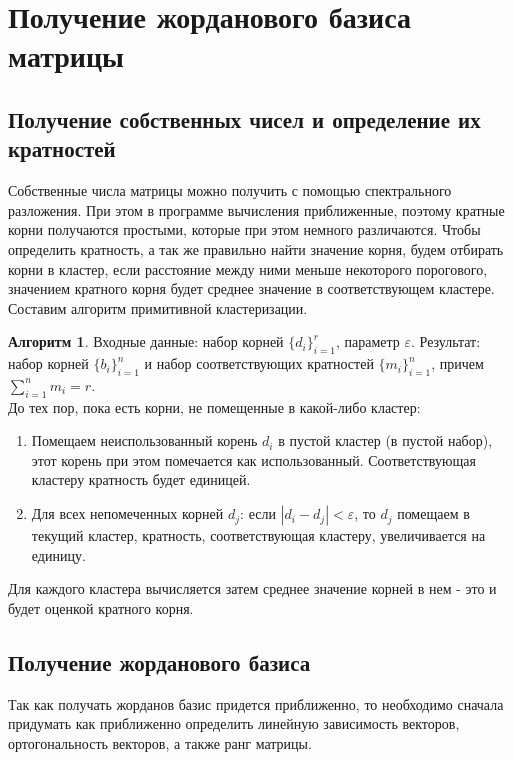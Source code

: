 \documentclass[specialist, substylefile = spbureport.rtx, subf,href,colorlinks=true, 12pt]{disser}
\theoremstyle{definition}
\newtheorem{algorithm}{Алгоритм}
\begin{document}
\section{Получение жорданового базиса матрицы}

\subsection{Получение собственных чисел и определение их кратностей}

Собственные числа матрицы можно получить с помощью спектрального разложения. При этом в программе вычисления приближенные, поэтому кратные корни получаются простыми, которые при этом немного различаются. Чтобы определить кратность, а так же правильно найти значение корня, будем отбирать корни в кластер, если расстояние между ними меньше некоторого порогового, значением кратного корня будет среднее значение в соответствующем кластере. Составим алгоритм примитивной кластеризации.

\begin{algorithm}
Входные данные: набор корней $\{ d_i\}_{i = 1}^{r}$, параметр $\varepsilon$. Результат: набор корней $\{ b_i\}_{i = 1}^{n}$ и набор соответствующих кратностей $\{ m_i\}_{i = 1}^{n}$, причем $\sum_{i = 1}^{n}m_i = r$. \\

До тех пор, пока есть корни, не помещенные в какой-либо кластер:
\begin{enumerate}
    \item Помещаем неиспользованный корень $d_i$ в пустой кластер (в пустой набор), этот корень при этом помечается как использованный. Соответствующая кластеру кратность будет единицей. 
    \item Для всех непомеченных корней $d_j$: если $|d_i - d_j| < \varepsilon$, то $d_j$ помещаем в текущий кластер, кратность, соответствующая кластеру, увеличивается на единицу.
\end{enumerate}
Для каждого кластера вычисляется затем среднее значение корней в нем - это и будет оценкой кратного корня.

\end{algorithm}

\subsection{Получение жорданового базиса}

Так как получать жорданов базис придется приближенно, то необходимо сначала придумать как приближенно определить линейную зависимость векторов, ортогональность векторов, а также ранг матрицы.
\end{document}
